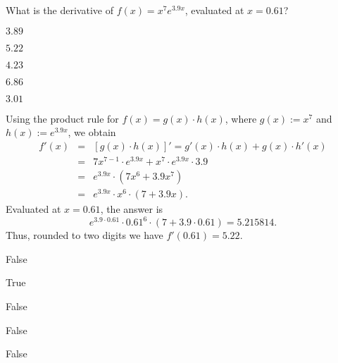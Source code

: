 
\begin{question}
What is the derivative of $f(x) = x^{7} e^{3.9x}$, evaluated at $x = 0.61$?

\begin{answerlist}
  \item $3.89$
  \item $5.22$
  \item $4.23$
  \item $6.86$
  \item $3.01$
\end{answerlist}\end{question}

\begin{solution}
Using the product rule for $f(x) = g(x) \cdot h(x)$, where $g(x) := x^{7}$ and $h(x) := e^{3.9x}$, we obtain
\begin{eqnarray*}
f'(x) & = & [g(x) \cdot h(x)]' = g'(x) \cdot h(x) + g(x) \cdot h'(x) \\
      & = & 7 x^{7 - 1} \cdot e^{3.9x} + x^{7} \cdot e^{3.9x} \cdot 3.9 \\
      & = & e^{3.9x} \cdot(7 x^6 + 3.9 x^{7}) \\
      & = & e^{3.9x} \cdot x^6 \cdot (7 + 3.9x).
\end{eqnarray*}
Evaluated at $x = 0.61$, the answer is
\[ e^{3.9\cdot 0.61} \cdot 0.61^6 \cdot (7 + 3.9\cdot 0.61) = 5.215814. \]
Thus, rounded to two digits we have $f'(0.61) = 5.22$.

\begin{answerlist}
  \item False
  \item True
  \item False
  \item False
  \item False
\end{answerlist}\end{solution}

